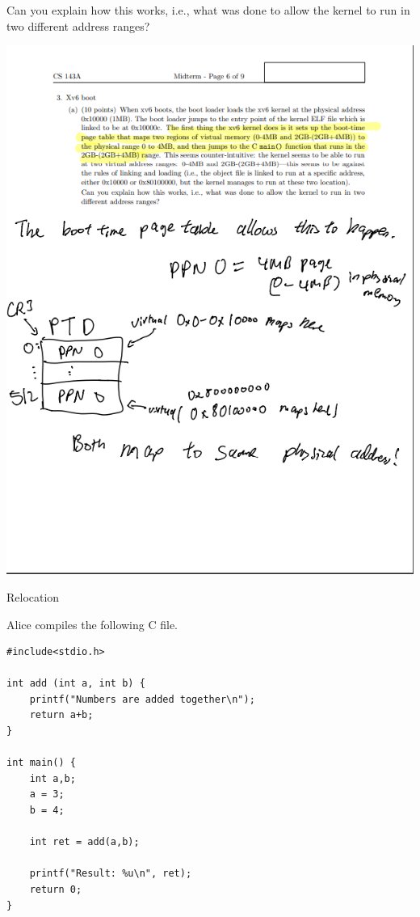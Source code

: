 \documentclass[11pt]{exam}
\begin{document}
\begin{questions}
\begin{parts}
	Can you explain how this works, i.e., what was done to allow the kernel to run in 
	two different address ranges?

\includegraphics[width=0.5\columnwidth]{figs/point-3a}
\vfill

\end{parts}

\newpage

\addpoints 

\question Relocation

Alice compiles the following C file. 

\begin{verbatim}
#include<stdio.h>

int add (int a, int b) {
    printf("Numbers are added together\n");
    return a+b;
}

int main() {
    int a,b;
    a = 3;
    b = 4;

    int ret = add(a,b);

    printf("Result: %u\n", ret);
    return 0; 
}
\end{verbatim}


\end{questions}
\end{document}
